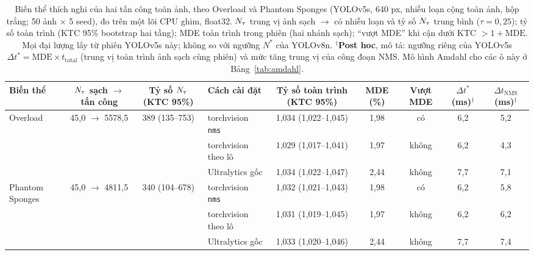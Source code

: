 \begin{table}[t]
\centering\small
\caption{Biến thể thích nghi của hai tấn công toàn ảnh, theo Overload và Phantom Sponges (YOLOv5s, 640 px, nhiễu loạn cộng toàn ảnh, hộp trắng; 50 ảnh $\times$ 5 seed), đo trên một lõi CPU ghim, float32. $N_{\tau}$ trung vị ảnh sạch $\to$ có nhiễu loạn và tỷ số $N_{\tau}$ trung bình ($\tau=0{,}25$); tỷ số toàn trình (KTC 95\% bootstrap hai tầng); MDE toàn trình trong phiên (hai nhánh sạch); ``vượt MDE'' khi cận dưới KTC $>1+\mathrm{MDE}$. Mọi đại lượng lấy từ phiên YOLOv5s này; không so với ngưỡng $N^{*}$ của YOLOv8n. $^{\dagger}$\textbf{Post hoc}, mô tả: ngưỡng riêng của YOLOv5s $\Delta t^{*}=\mathrm{MDE}\times t_{\mathrm{total}}$ (trung vị toàn trình ảnh sạch cùng phiên) và mức tăng trung vị của công đoạn NMS. Mô hình Amdahl cho các ô này ở Bảng~\ref{tab:amdahl}.}
\label{tab:attacks}
\begin{tabular}{@{}lcclccccc@{}}
\toprule
Biến thể & $N_{\tau}$ sạch $\to$ tấn công & Tỷ số $N_{\tau}$ (KTC 95\%) & Cách cài đặt & Tỷ số toàn trình (KTC 95\%) & MDE (\%) & Vượt MDE & $\Delta t^{*}$ (ms)$^{\dagger}$ & $\Delta t_{\mathrm{NMS}}$ (ms)$^{\dagger}$ \\
\midrule
Overload & 45,0 $\to$ 5578,5 & 389 (135--753) & torchvision \texttt{nms} & 1,034 (1,022--1,045) & 1,98 & có & 6,2 & 5,2 \\
 & &  & torchvision theo lô & 1,029 (1,017--1,041) & 1,97 & không & 6,2 & 4,3 \\
 & &  & Ultralytics gốc & 1,034 (1,022--1,047) & 2,44 & không & 7,7 & 7,1 \\
Phantom Sponges & 45,0 $\to$ 4811,5 & 340 (104--678) & torchvision \texttt{nms} & 1,032 (1,021--1,043) & 1,98 & có & 6,2 & 5,8 \\
 & &  & torchvision theo lô & 1,031 (1,019--1,045) & 1,97 & không & 6,2 & 6,2 \\
 & &  & Ultralytics gốc & 1,033 (1,020--1,046) & 2,44 & không & 7,7 & 7,4 \\
\bottomrule
\end{tabular}
\end{table}
